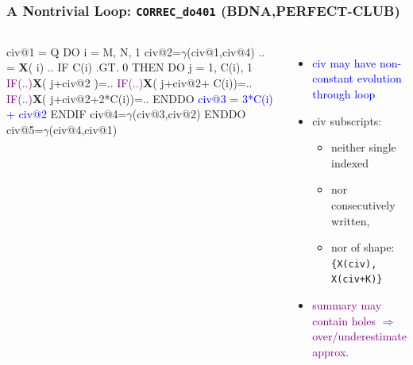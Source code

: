 \documentclass{beamer}
\newcommand{\blue}[1]{\textcolor{Blue}{{#1}}}
\newcommand{\purple}[1]{\textcolor{Purple}{{#1}}}
\newcommand{\emp}[1]{\textcolor{DikuRed}{ #1}}
\newcommand{\mymath}[1]{$ #1 $}
\begin{document}
\begin{frame}[fragile,t]
\frametitle{A Nontrivial Loop: {\tt CORREC\_do401} {\scriptsize(BDNA,PERFECT-CLUB)}}

\begin{columns}
\begin{colorcode}[fontsize=\small]
civ@1 = Q
DO i = M, N, 1
 civ@2=\mymath{\gamma}(civ@1,civ@4)
 .. = {\bf X}(\emp{i}) ..
 IF C(i) .GT. 0 THEN
  DO j = 1, C(i), 1
   \purple{IF(..)}{\bf{}X}(\emp{j+civ@2       })=..
   \purple{IF(..)}{\bf{}X}(\emp{j+civ@2+  C(i)})=..
   \purple{IF(..)}{\bf{}X}(\emp{j+civ@2+2*C(i)})=..
  ENDDO
  \blue{civ@3 = 3*C(i) + civ@2}
 ENDIF
 civ@4=\mymath{\gamma}(civ@3,civ@2)
ENDDO
civ@5=\mymath{\gamma}(civ@4,civ@1)
\end{colorcode}
\begin{itemize}
    \item \blue{{\sc civ} may have non-constant evolution through loop}\pause\medskip
    \item \emp{{\sc civ} subscripts:} 
        \begin{itemize}
            \item neither single indexed 
            \item nor consecutively written, 
            \item nor of shape:\\ 
                    {\tt \{X(civ), X(civ+K)\}}
        \end{itemize}\pause\medskip
    \item \purple{summary may contain holes $\Rightarrow$ over/underestimate approx.}
\end{itemize}
\end{columns}
\end{frame}
\end{document}

